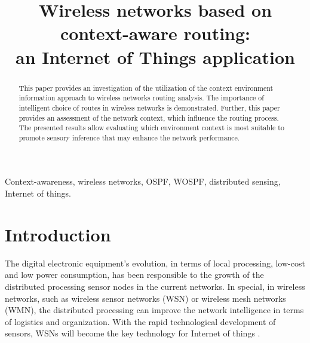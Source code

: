 \documentclass[conference]{IEEEtran}
\begin{document}
\title{Wireless networks based on context-aware routing:\\an Internet of Things application}

\author{
}

\maketitle

\begin{abstract}
This paper provides an investigation of the utilization of the context environment information approach to wireless networks routing analysis. The importance of intelligent choice of routes in wireless networks is demonstrated. Further, this paper provides an assessment of the network context, which influence the routing process. The presented results allow evaluating which environment context is most suitable to promote sensory inference that may enhance the network performance.
\end{abstract}


\begin{IEEEkeywords}
Context-awareness, wireless networks, OSPF, WOSPF, distributed sensing, Internet of things.
\end{IEEEkeywords}

\section{Introduction}
The digital electronic equipment’s evolution, in terms of local processing, low-cost and low power consumption, has been responsible to the growth of the distributed processing sensor nodes in the current networks. In special, in wireless networks, such as wireless sensor networks (WSN) or wireless mesh networks (WMN), the distributed processing can improve the network intelligence in terms of logistics and organization. With the rapid technological development of sensors, WSNs will become the key technology for Internet of things \cite{IEC2014}.
\end{document}
